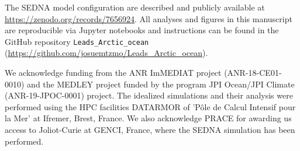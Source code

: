 \documentclass[lineno,sn-basic]{sn-jnl}%
\begin{document}
\backmatter


The SEDNA model configuration are described and publicly available at \url{https://zenodo.org/records/7656924}.
All analyses and figures in this manuscript are reproducible via Jupyter notebooks and instructions can be found in the GitHub repository \texttt{Leads\_Arctic\_ocean} (\url{https://github.com/josuemtzmo/Leads_Arctic_ocean}).


We acknowledge funding from the ANR ImMEDIAT project (ANR-18-CE01-0010) and the MEDLEY project funded by the program JPI Ocean/JPI Climate (ANR-19-JPOC-0001) project. 
The idealized simulations and their analysis were performed using the HPC facilities DATARMOR of ’Pôle de Calcul Intensif pour la Mer’ at Ifremer, Brest, France. We also acknowledge PRACE for awarding us access to Joliot-Curie at GENCI\makeatletter@CEA, France, where the SEDNA simulation has been performed.







\pagebreak
\end{document}
